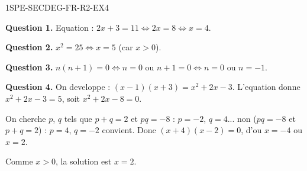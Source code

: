 \begin{corrige}{1SPE-SECDEG-FR-R2-EX4}

\textbf{Question 1.} Equation : $2x + 3 = 11 \Leftrightarrow 2x = 8 \Leftrightarrow x = 4$.

\textbf{Question 2.} $x^2 = 25 \Leftrightarrow x = 5$ (car $x > 0$).

\textbf{Question 3.} $n(n+1) = 0 \Leftrightarrow n = 0$ ou $n + 1 = 0 \Leftrightarrow n = 0$ ou $n = -1$.

\textbf{Question 4.} On developpe : $(x-1)(x+3) = x^2 + 2x - 3$. L'equation donne $x^2 + 2x - 3 = 5$, soit $x^2 + 2x - 8 = 0$.

On cherche $p$, $q$ tels que $p + q = 2$ et $pq = -8$ : $p = -2$, $q = 4$... non ($pq = -8$ et $p+q = 2$) : $p = 4$, $q = -2$ convient. Donc $(x + 4)(x - 2) = 0$, d'ou $x = -4$ ou $x = 2$.

Comme $x > 0$, la solution est $x = 2$.

\end{corrige}
